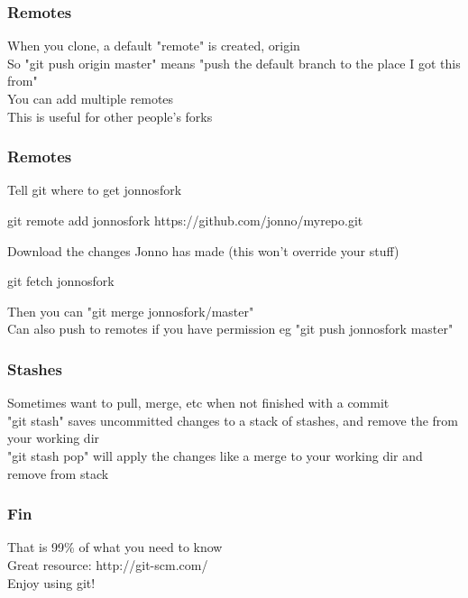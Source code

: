 \documentclass[xcolor=dvipsnames]{beamer}
\begin{document}
\begin{frame}
    \frametitle{Remotes}

    When you clone, a default "remote" is created, origin\\
    So "git push origin master" means "push the default branch to the place I got this from"\\
    You can add multiple remotes\\
    This is useful for other people's forks
\end{frame}

\begin{frame}
    \frametitle{Remotes}
    Tell git where to get jonnosfork
    \begin{block}{}
        git remote add jonnosfork https://github.com/jonno/myrepo.git
    \end{block}

    Download the changes Jonno has made (this won't override your stuff)
    \begin{block}{}
        git fetch jonnosfork     
    \end{block}
    
    Then you can "git merge jonnosfork/master"\\
    Can also push to remotes if you have permission eg "git push jonnosfork master"
\end{frame}

\begin{frame}
    \frametitle{Stashes}
    
    Sometimes want to pull, merge, etc when not finished with a commit\\
    "git stash" saves uncommitted changes to a stack of stashes, and remove the from your working dir\\
    "git stash pop" will apply the changes like a merge to your working dir and remove from stack\\
\end{frame}

\begin{frame}
    \frametitle{Fin}

     That is 99\% of what you need to know\\
     Great resource: http://git-scm.com/\\
     Enjoy using git!
\end{frame}
\end{document}
